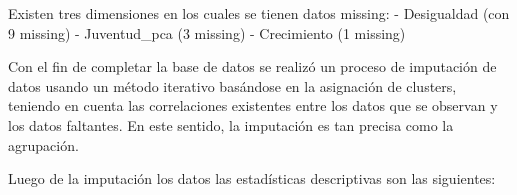 Existen tres dimensiones en los cuales se tienen datos missing: -
Desigualdad (con 9 missing) - Juventud\_pca (3 missing) - Crecimiento (1
missing)

Con el fin de completar la base de datos se realizó un proceso de
imputación de datos usando un método iterativo basándose en la
asignación de clusters, teniendo en cuenta las correlaciones existentes
entre los datos que se observan y los datos faltantes. En este sentido,
la imputación es tan precisa como la agrupación.

Luego de la imputación los datos las estadísticas descriptivas son las
siguientes:

\providecommand{\docline}[3]{\noalign{\global\setlength{\arrayrulewidth}{#1}}\arrayrulecolor[HTML]{#2}\cline{#3}}

\setlength{\tabcolsep}{2pt}

\renewcommand*{\arraystretch}{1.5}

